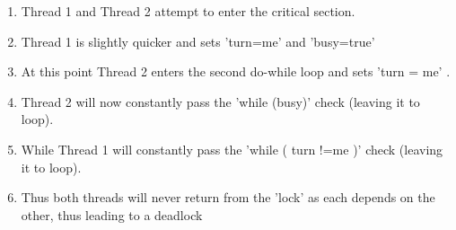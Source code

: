 \begin{enumerate}
\item Thread 1 and Thread 2 attempt to enter the critical section.
\item Thread 1 is slightly quicker and sets 'turn=me' and 'busy=true'
\item At this point Thread 2 enters the second do-while loop and sets 'turn = me' .
\item Thread 2 will now constantly pass the 'while (busy)' check (leaving it to loop).
\item While Thread 1 will constantly pass the 'while ( turn !=me )' check (leaving it to loop).
\item Thus both threads will never return from the 'lock' as each depends on the other, thus leading to a deadlock
\end{enumerate}